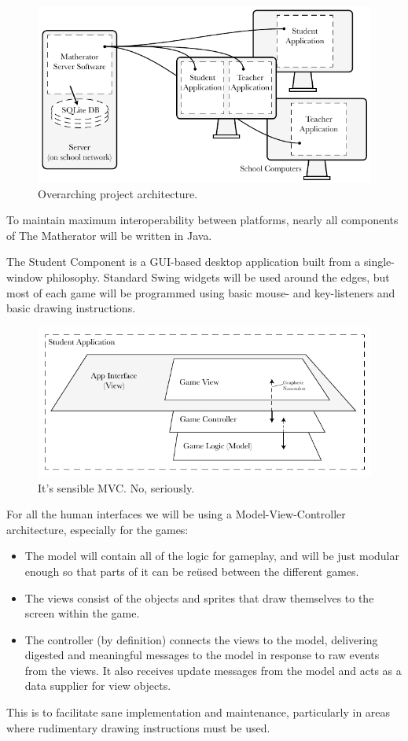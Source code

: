 \documentclass[11pt,a4paper,twoside]{report}
\begin{document}
\begin{figure}[hb]
    \centering
    \includegraphics{OverarchingArchitecture}
    \caption{Overarching project architecture.}
    \label{fig:overarch}
\end{figure}


To maintain maximum interoperability between platforms, nearly all components of The Matherator will be written in Java.

The Student Component is a GUI-based desktop application built from a single-window philosophy. Standard Swing widgets will be used around the edges, but most of each game will be programmed using basic mouse- and key-listeners and basic drawing instructions.


\begin{figure}[htb]
    \centering
    \includegraphics{MvcNoSrsly}
    \caption{It’s sensible MVC. No, seriously.}
    \label{fig:mvsee}
\end{figure}


For all the human interfaces we will be using a Model-View-Controller architecture, especially for the games:
\begin{itemize}
    \item The model will contain all of the logic for gameplay, and will be just modular enough so that parts of it can be reüsed between the different games.
    \item The views consist of the objects and sprites that draw themselves to the screen within the game.
    \item The controller (by definition) connects the views to the model, delivering digested and meaningful messages to the model in response to raw events from the views. It also receives update messages from the model and acts as a data supplier for view objects.
\end{itemize}
This is to facilitate sane implementation and maintenance, particularly in areas where rudimentary drawing instructions must be used.
\end{document}
